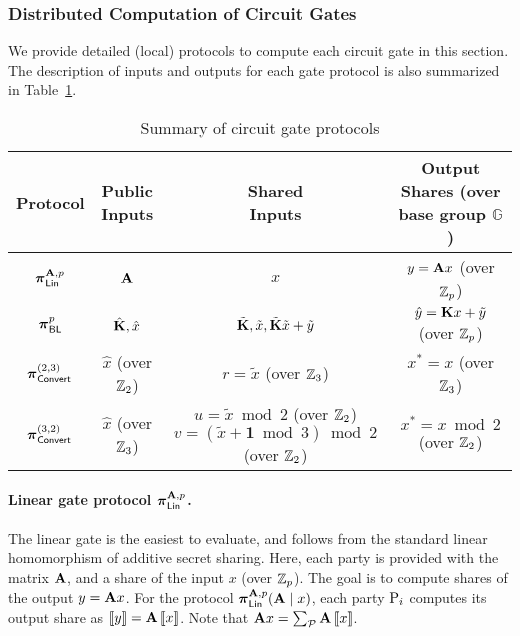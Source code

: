 \subsubsection{Distributed Computation of Circuit Gates}


We provide detailed (local) protocols to compute each circuit gate in this section. The description of inputs and outputs for each gate protocol is also summarized in Table~\ref{table:gate_protocol_summary}.


\begin{table}[h]
\centering
{
\renewcommand{\arraystretch}{1.5}
\begin{tabular}{|c|c|c|c|}

\hline
Protocol & \makecell{Public \\ Inputs} & \makecell{Shared \\ Inputs} & \makecell{Output Shares \\ (over base group $\mathbb{G}$)} \\
\hline
$\prot_{\LMap}^{\mat{A},p}$ & $\mat{A}$ & $x$ & $y = \mat{A}x$ (over $\mathbb{Z}_p$)\\
\hline
$\boldsymbol{\pi}_{\textsf{BL}}^p$ & $\hat{\mat{K}}, \hat{x}$ & $\tilde{\mat{K}},\tilde{x}, \tilde{\mat{K}}\tilde{x} + \tilde{y}$ & $\hat{y} = \mat{K}x + \tilde{y}$ (over $\mathbb{Z}_p$)\\
\hline
$\boldsymbol{\pi}_{\textsf{Convert}}^{(2,3)}$ & $\hat{x}$ (over $\mathbb{Z}_2$) & $r = \tilde{x}$ (over $\mathbb{Z}_3$) & $x^* = x$ (over $\mathbb{Z}_3$) \\
\hline
$\boldsymbol{\pi}_{\textsf{Convert}}^{(3,2)}$ & $\hat{x}$ (over $\mathbb{Z}_3$) & \makecell{$u = \tilde{x} \bmod 2$ (over $\mathbb{Z}_2$) \\ $v = (\tilde{x} + \textbf{1} \bmod 3) \bmod 2$ (over $\mathbb{Z}_2$)} & $x^* = x \bmod 2$ (over $\mathbb{Z}_2$) \\
\hline
\end{tabular}
}
\caption{Summary of circuit gate protocols}
\label{table:gate_protocol_summary}
\end{table}


\paragraph{Linear gate protocol $\prot_\LMap^{\mat{A}, p}$.}
The linear gate is the easiest to evaluate, and follows from the standard linear homomorphism of additive secret sharing. Here, each party is provided with the matrix $\mat{A}$, and a share of the input $x$ (over $\mathbb{Z}_p$). The goal is to compute shares of the output $y = \mat{A}x$. For the protocol $\prot_\LMap^{\mat{A}, p}(\mat{A} \mid x)$, each party $\textnormal{P}_i$ computes its output share as $\share{y} = \mat{A}\share{x}$. Note that $\mat{A}x = \sum_{\parties}\mat{A}\share{x}$.


